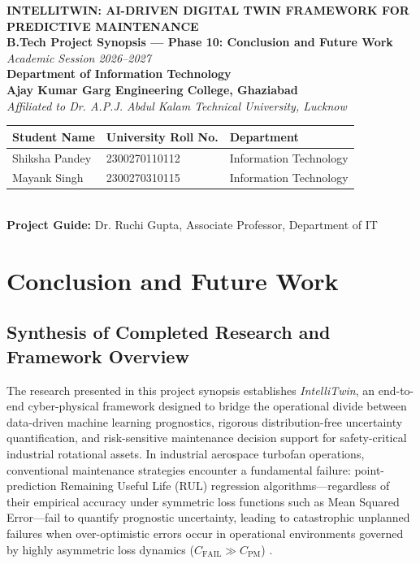 \documentclass[12pt,a4paper]{article}
\begin{document}
\begin{center}
    {\fontsize{18pt}{22pt}\bfseries INTELLITWIN: AI-DRIVEN DIGITAL TWIN FRAMEWORK FOR PREDICTIVE MAINTENANCE}\\[12pt]
    {\fontsize{14pt}{17pt}\bfseries B.Tech Project Synopsis --- Phase 10: Conclusion and Future Work}\\[8pt]
    {\fontsize{12pt}{15pt}\textit{Academic Session 2026--2027}}\\[12pt]
    \textbf{Department of Information Technology}\\
    \textbf{Ajay Kumar Garg Engineering College, Ghaziabad}\\
    \textit{Affiliated to Dr. A.P.J. Abdul Kalam Technical University, Lucknow}\\[14pt]
    \begin{tabular}{lll}
        \textbf{Student Name} & \textbf{University Roll No.} & \textbf{Department} \\
        \hline
        Shiksha Pandey & 2300270110112 & Information Technology \\
        Mayank Singh & 2300270310115 & Information Technology \\
    \end{tabular}\\[10pt]
    \textbf{Project Guide:} Dr. Ruchi Gupta, Associate Professor, Department of IT
\end{center}

\vspace{10pt}

\section{Conclusion and Future Work}

\subsection{Synthesis of Completed Research and Framework Overview}
The research presented in this project synopsis establishes \textit{IntelliTwin}, an end-to-end cyber-physical framework designed to bridge the operational divide between data-driven machine learning prognostics, rigorous distribution-free uncertainty quantification, and risk-sensitive maintenance decision support for safety-critical industrial rotational assets. In industrial aerospace turbofan operations, conventional maintenance strategies encounter a fundamental failure: point-prediction Remaining Useful Life (RUL) regression algorithms---regardless of their empirical accuracy under symmetric loss functions such as Mean Squared Error---fail to quantify prognostic uncertainty, leading to catastrophic unplanned failures when over-optimistic errors occur in operational environments governed by highly asymmetric loss dynamics ($C_{\text{FAIL}} \gg C_{\text{PM}}$) \cite{saxena2008damage, cortesgomez2025predictive}. 
\end{document}

